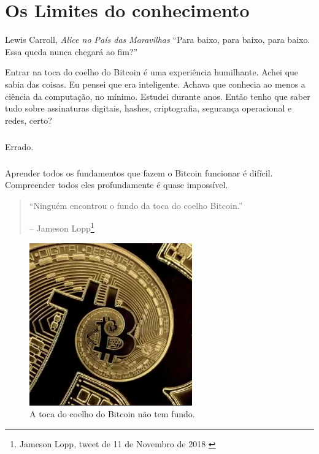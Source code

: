 \chapter{Os Limites do conhecimento}
\label{les:7}

\begin{chapquote}{Lewis Carroll, \textit{Alice no País das Maravilhas}}
\enquote{Para baixo, para baixo, para baixo. Essa queda nunca chegará ao fim?}
\end{chapquote}

Entrar na toca do coelho do Bitcoin é uma experiência humilhante. Achei que sabia das coisas. Eu pensei que era inteligente. Achava que conhecia ao menos a ciência da computação, no mínimo. Estudei durante anos. Então tenho que saber tudo sobre assinaturas digitais, hashes, criptografia, segurança operacional e redes, certo?

\paragraph{}
Errado.

\paragraph{}
Aprender todos os fundamentos que fazem o Bitcoin funcionar é difícil. Compreender todos eles profundamente é quase impossível.

\begin{quotation}\begin{samepage}
\enquote{Ninguém encontrou o fundo da toca do coelho Bitcoin.}
\begin{flushright} -- Jameson Lopp\footnote{Jameson Lopp, tweet de 11 de Novembro de 2018 \cite{lopp-tweet}}
\end{flushright}\end{samepage}\end{quotation}

\begin{figure}
  \centering
  \includegraphics[width=7cm]{assets/images/rabbit-hole-bottomless.png}
  \caption{A toca do coelho do Bitcoin não tem fundo.}
  \label{fig:rabbit-hole-bottomless}
\end{figure}

